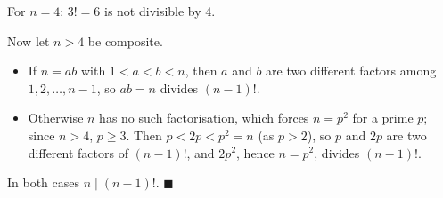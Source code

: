 For $n=4$: $3!=6$ is not divisible by $4$.

Now let $n>4$ be composite.
\begin{itemize}
\item If $n=ab$ with $1<a<b<n$, then $a$ and $b$ are two different factors among $1,2,\dots,n-1$, so $ab=n$ divides $(n-1)!$.
\item Otherwise $n$ has no such factorisation, which forces $n=p^2$ for a prime $p$; since $n>4$, $p\ge3$. Then $p<2p<p^2=n$ (as $p>2$), so $p$ and $2p$ are two different factors of $(n-1)!$, and $2p^2$, hence $n=p^2$, divides $(n-1)!$.
\end{itemize}
In both cases $n\mid(n-1)!$. $\blacksquare$

